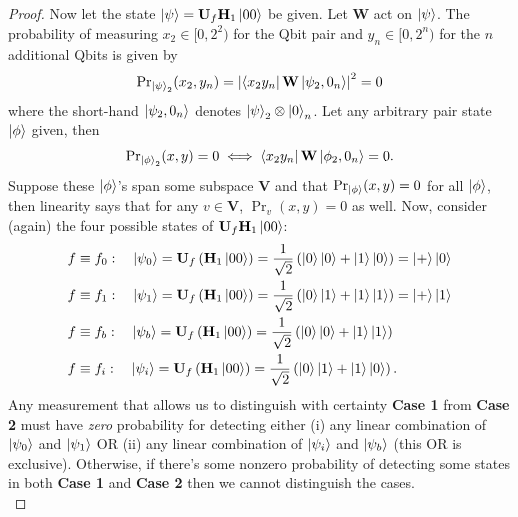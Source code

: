 \documentclass{book}
\theoremstyle{definition}
\newcommand{\nn}{\nonumber}
\newcommand{\f}[2]{\frac{#1}{#2}}
\newcommand{\lp}{\left(}
\newcommand{\rp}{\right)}
\newcommand{\V}{\mathbf{V}}
\newcommand{\had}{\mathbf{H}}
\begin{document}
\begin{enumerate}[(a)]
\begin{proof}
		Now let the state $\ket{\psi} = \mathbf{U}_f\had_1\ket{00}$ be given. Let $\mathbf{W}$ act on $\ket{\psi}$. The probability of measuring $x_2\in [0,2^2)$ for the Qbit pair and $y_n\in [0,2^n)$ for the $n$ additional Qbits is given by
		\begin{align}
		{\Pr}_{\ket{\psi}_2}(x_2,y_{n}) = \abs{ \bra{x_2y_n} \mathbf{W}\ket{\psi_2,0_n}}^2 = 0
		\end{align}
		where the short-hand $\ket{\psi_2,0_n}$ denotes $\ket{\psi}_2\otimes \ket{0}_n$. Let any arbitrary pair state $\ket{\phi}$ given, then
		\begin{align}
		{\Pr}_{\ket{\phi}_2}(x,y)= 0 \iff \bra{x_2y_n} \mathbf{W}\ket{\phi_2,0_n} = 0.
		\end{align}
		Suppose these $\ket{\phi}$'s span some subspace $\V$ and that ${\Pr}_{\ket{\phi}} (x,y) = 0$ for all $\ket{\phi}$, then linearity says that for any $v \in \V$, ${\Pr}_v(x,y) = 0$ as well. Now, consider (again) the four possible states of $\mathbf{U}_f\had_1\ket{00}$:
		\begin{align}
		&f \equiv f_0: \quad \ket{\psi_0} = \mathbf{U}_f\lp \had_1\ket{00} \rp 
		= \f{1}{\sqrt{2}}\lp \ket{0}\ket{0} + \ket{1}\ket{0} \rp 
		= \ket{+}\ket{0} \nn\\
		&f \equiv f_1: \quad \ket{\psi_1} = \mathbf{U}_f\lp \had_1\ket{00} \rp 
		= \f{1}{\sqrt{2}}\lp \ket{0}\ket{1} + \ket{1}\ket{1} \rp 
		= \ket{+}\ket{1} \nn\\
		&f \equiv f_b: \quad \ket{\psi_b} = \mathbf{U}_f\lp \had_1\ket{00} \rp 
		=  \f{1}{\sqrt{2}}\lp \ket{0}\ket{0} + \ket{1}\ket{1} \rp\nn\\
		&f \equiv f_i: \quad \ket{\psi_i} = \mathbf{U}_f\lp \had_1\ket{00}\rp 
		=  \f{1}{\sqrt{2}}\lp \ket{0}\ket{1} + \ket{1}\ket{0} \rp.
		\end{align}
		Any measurement that allows us to distinguish with certainty \textbf{Case 1} from \textbf{Case 2} must have \textit{zero} probability for detecting either (i) any linear combination of $\ket{\psi_0}$ and $\ket{\psi_1}$ OR (ii) any linear combination of $\ket{\psi_i}$ and $\ket{\psi_b}$ (this OR is exclusive). Otherwise, if there's some nonzero probability of detecting some states in both \textbf{Case 1} and \textbf{Case 2} then we cannot distinguish the cases. \\
		

\end{proof}
\end{enumerate}
\end{document}
